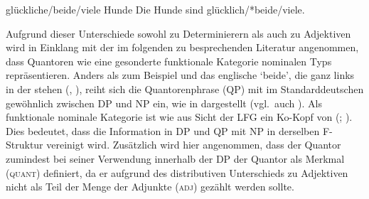 \begin{exe}
\label{ex:beidedet}
\ex \begin{xlist}
		\label{ex:beidedet_1}
		\label{ex:beidedet_2}
		\label{ex:beidedet_3}
		\label{ex:beidedet_4}
\end{xlist}

\ex \begin{xlist}
	\ex glückliche/beide/viele Hunde
		\label{ex:beidepred_1}
	\ex Die Hunde sind glücklich/*beide/viele.
		\label{ex:beidepred_2}
\end{xlist}
\end{exe}

Aufgrund dieser Unterschiede sowohl zu 
Determinierern als auch zu Adjektiven
wird in Einklang mit der im folgenden zu besprechenden Literatur angenommen,
dass Quantoren wie  eine gesonderte funktionale Kategorie 
nominalen Typs repräsentieren. Anders als zum Beispiel  und das
englische  `beide', die ganz links in der
 stehen (, ), reiht
sich die Quantorenphrase (QP) mit  im Standarddeutschen gewöhnlich
zwischen DP und NP ein, wie in
 dargestellt (vgl.~auch \cite[44--45 mit Fußnote
30]{lyons1999}). Als funktionale nominale Kategorie ist  wie 
aus Sicht der LFG ein Ko-Kopf von
 (; \cite[124]{bresnanetal2016}). Dies bedeutet, dass die
Information in DP und QP mit NP in derselben F-Struktur vereinigt wird. Zusätzlich wird hier angenommen, dass der Quantor
zumindest bei seiner Verwendung innerhalb der DP der Quantor als
Merkmal (\textsc{quant}) definiert, da er aufgrund
des distributiven Unterschieds zu Adjektiven nicht als Teil der Menge der
Adjunkte (\textsc{adj}) gezählt werden sollte.

